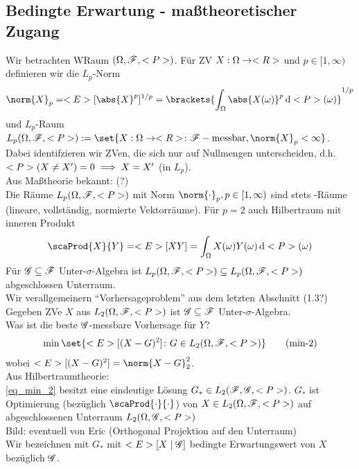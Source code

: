 \subsection{Bedingte Erwartung - maßtheoretischer Zugang}
Wir betrachten WRaum $(\O, \F,\P)$. Für ZV $X: \O \to \R$ und $p \in [1,\infty)$ definieren wir die $L_p$-Norm
\begin{align*}
	\norm{X}_p = \E[\abs{X}^p]^{1/p} = \brackets{\int_{\O} \abs{X(\omega)}^p \d \P(\omega)}^{1/p}
\end{align*}
und $L_p$-Raum $L_p(\O,\F,\P):= \set{X: \O \to \R\colon \F-\text{messbar}, \norm{X}_p < \infty}$. Dabei identifzieren wir ZVen, die sich nur auf Nullmengen unterscheiden, d.h. $\P(X \neq X') = 0 \implies X = X'$ (in $L_p$).\\
Aus Maßtheorie bekannt: (?)\\
Die Räume $L_p(\O,\F,\P)$ mit Norm $\norm{\cdot}_p, p \in [1,\infty)$ sind stets -Räume (lineare, vollständig, normierte Vektorräume). Für $p = 2$ auch Hilbertraum mit inneren Produkt
\begin{align*}
	\scaProd{X}{Y} = \E[XY] = \int_{\O} X(\omega)Y(\omega)\d \P(\omega)
\end{align*}
Für $\G \subseteq \F$ Unter-$\sigma$-Algebra ist $L_p(\O,\F,\P) \subseteq L_p(\O,\F,\P)$ abgeschlossen Unterraum.\\
Wir verallgemeinern ``Vorhersageproblem'' aus dem letzten Abschnitt (1.3?)\\
Gegeben ZVe $X$ aus $L_2(\O,\F,\P)$ ist $\G \subseteq \F$ Unter-$\sigma$-Algebra.\\
Was ist die beste $\G$-messbare Vorhersage für $Y$?
\begin{align*}
	\min\set{\E[(X-G)^2] \colon G \in L_2(\O,\F,\P)} \tag{min-2}\label{eq_min_2}
\end{align*}
wobei $\E[(X-G)^2] = \norm{X-G}^2_2$.\\
Aus Hilbertraumtheorie:\\
\eqref{eq_min_2} besitzt eine eindeutige Lösung $G_{\ast} \in L_2(\F,\G,\P)$. $G_{\ast}$ ist Optimierung (bezüglich $\scaProd{\cdot}{\cdot}$) von $X \in L_2(\O,\F,\P)$ auf abgeschlossenen Unterraum $L_2(\O,\G,\P)$\\
Bild: eventuell von Eric (Orthogonal Projektion auf den Unterraum)\\
Wir bezeichnen mit $G_{\ast}$ mit $\E[X\mid \G]$ bedingte Erwartungswert von $X$ bezüglich $\G$.
